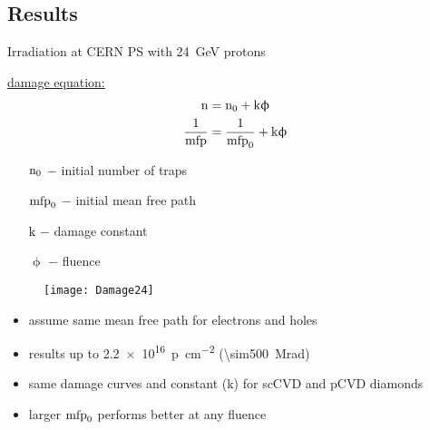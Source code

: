 \subsection{Results}
\begin{frame}{Irradiation at CERN PS with \SI{24}{\giga\electronvolt} protons}

	\begin{minipage}{4.5cm}
		\underline{damage equation:}
		\vspace*{-3pt}
		\begin{align*}
			\text{n} 				&= \text{n}_0 + \text{k}\upphi\\
			\frac{1}{\text{mfp}}	&= \frac{1}{\text{mfp}_0} + \text{k}\upphi
		\end{align*}
		\vspace*{-5pt}
		\begin{itemize}
			\item[\textcolor{black}{$\text{n}_0$}] $-$ initial number of traps
			\item[\textcolor{black}{$\text{mfp}_0$}] $-$ initial mean free path
			\item[\textcolor{black}{k}] $-$ damage constant
			\item[\textcolor{black}{$\upphi$}] $-$ fluence
		\end{itemize}
	\end{minipage}
	\hspace*{2pt}
	\begin{minipage}{6.5cm}
		\begin{figure}[h]
			\centering
			\texttt{[image: Damage24]}
		\end{figure}
	\end{minipage}
	
	\begin{itemize}
		\itemfill
		\item assume same mean free path for electrons and holes
		\item results up to \SI{2.2e16}{p\per cm^2} (\SI{\sim500}{\mega rad})
		\item same damage curves and constant (k) for scCVD and pCVD diamonds
		\item larger $\text{mfp}_0$ performs better at any fluence 
	\end{itemize}

\end{frame}

